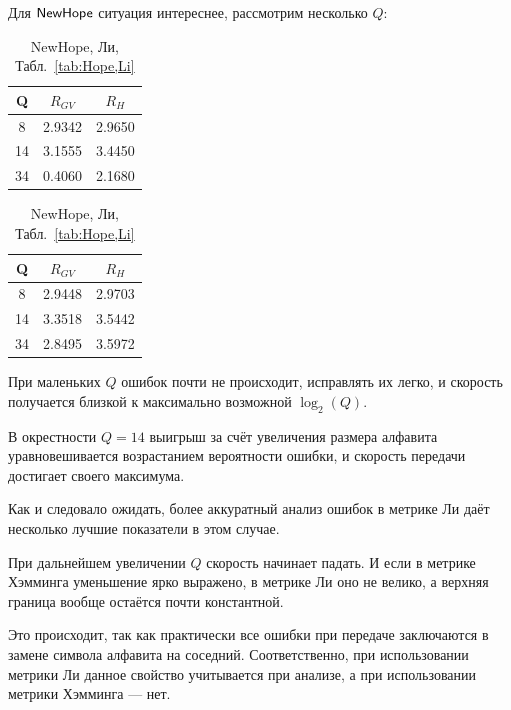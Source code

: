 Для $\mathsf{NewHope}$ ситуация интереснее, рассмотрим несколько $Q$:
\begin{table}[h]
	\centering
	\begin{minipage}{0.48\textwidth}
		\centering
		\caption{NewHope, Хэмминг, Табл.~\ref{tab:Hope,Ham}}
		\begin{tabular}{|c|c|c|}
			\hline Q & $R_{GV}$ & $R_H$ \\ \hline
			8 & 2.9342 & 2.9650 \\ \hline
			14 & 3.1555 & 3.4450 \\ \hline
			34 & 0.4060 & 2.1680 \\ \hline
		\end{tabular}
	\end{minipage}
	\hfill
	\begin{minipage}{0.48\textwidth}
		\centering
		\caption{NewHope, Ли, Табл.~\ref{tab:Hope,Li}}
		\begin{tabular}{|c|c|c|}
			\hline Q & $R_{GV}$ & $R_H$ \\ \hline
			8 & 2.9448 & 2.9703 \\ \hline
			14 & 3.3518 & 3.5442 \\ \hline
			34 & 2.8495 & 3.5972 \\ \hline
		\end{tabular}
	\end{minipage}
\end{table}

При маленьких $Q$ ошибок почти не происходит, исправлять их легко, и скорость получается близкой к максимально возможной $\log_2(Q)$.

В окрестности $Q = 14$ выигрыш за счёт увеличения размера алфавита уравновешивается возрастанием вероятности ошибки, и скорость передачи достигает своего максимума.

Как и следовало ожидать, более аккуратный анализ ошибок в метрике Ли даёт несколько лучшие показатели в этом случае.

При дальнейшем увеличении $Q$ скорость начинает падать. И если в метрике Хэмминга уменьшение ярко выражено, в метрике Ли оно не велико, а верхняя граница вообще остаётся почти константной.

Это происходит, так как практически все ошибки при передаче заключаются в замене символа алфавита на соседний. Соответственно, при использовании метрики Ли данное свойство учитывается при анализе, а при использовании метрики Хэмминга --- нет.
